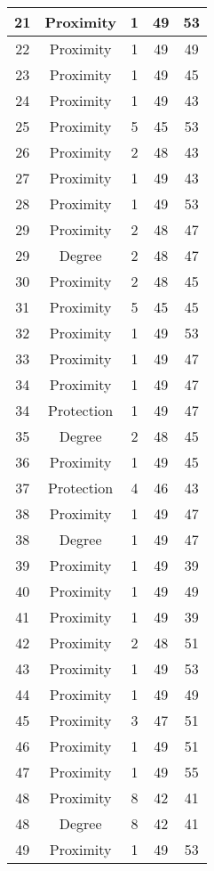 \documentclass[results.tex]{subfiles}
\begin{document}
\begin{center}
\begin{tabular}{| c || c | c | c | c |}
    \hline
    21 & Proximity & 1 & 49 & 53 \\ 
    \hline
    22 & Proximity & 1 & 49 & 49 \\ 
    \hline
    23 & Proximity & 1 & 49 & 45 \\ 
    \hline
    24 & Proximity & 1 & 49 & 43 \\ 
    \hline
    25 & Proximity & 5 & 45 & 53 \\ 
    \hline
    26 & Proximity & 2 & 48 & 43 \\ 
    \hline
    27 & Proximity & 1 & 49 & 43 \\ 
    \hline
    28 & Proximity & 1 & 49 & 53 \\ 
    \hline
    29 & Proximity & 2 & 48 & 47 \\ 
    \hline
    29 & Degree & 2 & 48 & 47 \\ 
    \hline
    30 & Proximity & 2 & 48 & 45 \\ 
    \hline
    31 & Proximity & 5 & 45 & 45 \\ 
    \hline
    32 & Proximity & 1 & 49 & 53 \\ 
    \hline
    33 & Proximity & 1 & 49 & 47 \\ 
    \hline
    34 & Proximity & 1 & 49 & 47 \\ 
    \hline
    34 & Protection & 1 & 49 & 47 \\ 
    \hline
    35 & Degree & 2 & 48 & 45 \\ 
    \hline
    36 & Proximity & 1 & 49 & 45 \\ 
    \hline
    37 & Protection & 4 & 46 & 43 \\ 
    \hline
    38 & Proximity & 1 & 49 & 47 \\ 
    \hline
    38 & Degree & 1 & 49 & 47 \\ 
    \hline
    39 & Proximity & 1 & 49 & 39 \\ 
    \hline
    40 & Proximity & 1 & 49 & 49 \\ 
    \hline
    41 & Proximity & 1 & 49 & 39 \\ 
    \hline
    42 & Proximity & 2 & 48 & 51 \\ 
    \hline
    43 & Proximity & 1 & 49 & 53 \\ 
    \hline
    44 & Proximity & 1 & 49 & 49 \\ 
    \hline
    45 & Proximity & 3 & 47 & 51 \\ 
    \hline
    46 & Proximity & 1 & 49 & 51 \\ 
    \hline
    47 & Proximity & 1 & 49 & 55 \\ 
    \hline
    48 & Proximity & 8 & 42 & 41 \\ 
    \hline
    48 & Degree & 8 & 42 & 41 \\ 
    \hline
    49 & Proximity & 1 & 49 & 53 \\ 
    \hline   \end{tabular}
\end{center}
\end{document}
